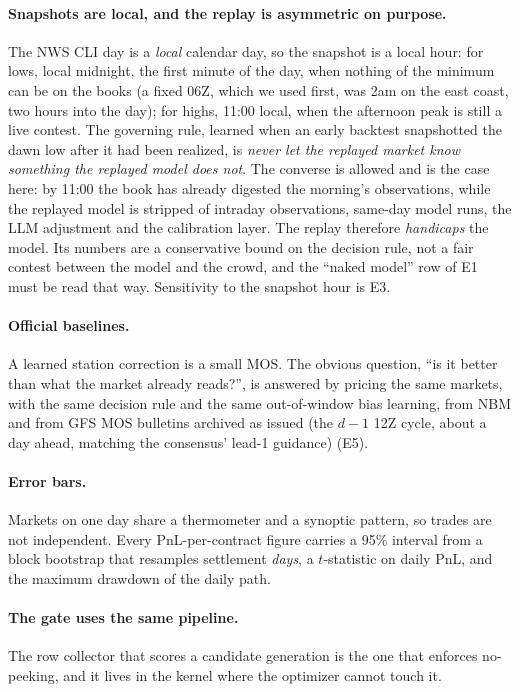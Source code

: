 \documentclass[sigconf,review,anonymous]{acmart}
\begin{document}
\paragraph{Snapshots are local, and the replay is asymmetric on purpose.} The
NWS CLI day is a \emph{local} calendar day, so the snapshot is a local hour: for
lows, local midnight, the first minute of the day, when nothing of the minimum
can be on the books (a fixed 06Z, which we used first, was 2am on the east
coast, two hours into the day); for highs, 11:00 local, when the afternoon peak
is still a live contest. The governing rule, learned when an early backtest
snapshotted the dawn low after it had been realized, is \emph{never let the
replayed market know something the replayed model does not}. The converse is
allowed and is the case here: by 11:00 the book has already digested the
morning's observations, while the replayed model is stripped of intraday
observations, same-day model runs, the LLM adjustment and the calibration layer.
The replay therefore \emph{handicaps} the model. Its numbers are a conservative
bound on the decision rule, not a fair contest between the model and the crowd,
and the ``naked model'' row of E1 must be read that way. Sensitivity to the
snapshot hour is E3.

\paragraph{Official baselines.} A learned station correction is a small MOS.
The obvious question, ``is it better than what the market already reads?'', is
answered by pricing the same markets, with the same decision rule and the same
out-of-window bias learning, from NBM and from GFS MOS bulletins archived as
issued (the $d\!-\!1$ 12Z cycle, about a day ahead, matching the consensus'
lead-1 guidance) (E5).

\paragraph{Error bars.} Markets on one day share a thermometer and a synoptic
pattern, so trades are not independent. Every PnL-per-contract figure carries a
95\% interval from a block bootstrap that resamples settlement \emph{days}, a
$t$-statistic on daily PnL, and the maximum drawdown of the daily path.

\paragraph{The gate uses the same pipeline.} The row collector that scores a
candidate generation is the one that enforces no-peeking, and it lives in the
kernel where the optimizer cannot touch it.
\end{document}
